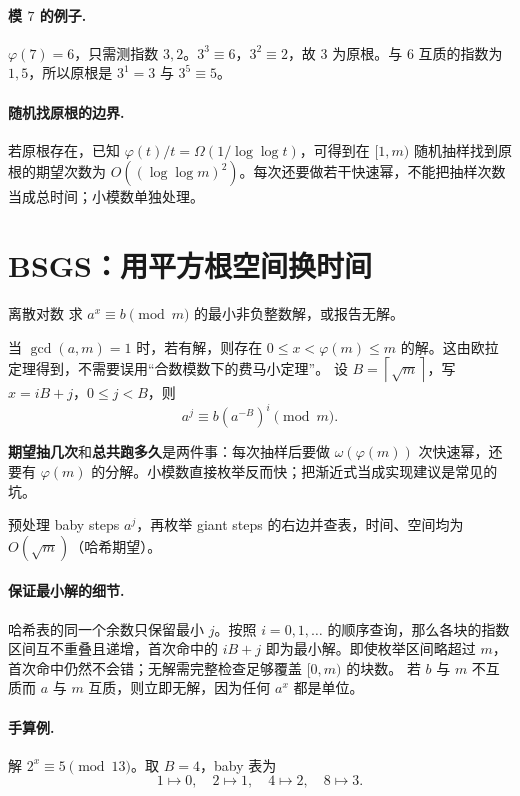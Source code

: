 \documentclass[UTF8,a4paper,11pt,twoside,openright,fontset=fandol]{ctexbook}
\theoremstyle{definition}
\newcommand{\ceil}[1]{\left\lceil #1\right\rceil}
\begin{document}
\paragraph{模 $7$ 的例子.} $\varphi(7)=6$，只需测指数 $3,2$。$3^3\equiv6$，$3^2\equiv2$，故 $3$ 为原根。与 $6$ 互质的指数为 $1,5$，所以原根是 $3^1=3$ 与 $3^5\equiv5$。
\paragraph{随机找原根的边界.} 若原根存在，已知 $\varphi(t)/t=\Omega(1/\log\log t)$，可得到在 $[1,m)$ 随机抽样找到原根的期望次数为 $O((\log\log m)^2)$。每次还要做若干快速幂，不能把抽样次数当成总时间；小模数单独处理。


\section{BSGS：用平方根空间换时间}
\begin{problem}{离散对数}
求 $a^x\equiv b\pmod m$ 的最小非负整数解，或报告无解。
\end{problem}
当 $\gcd(a,m)=1$ 时，若有解，则存在 $0\le x<\varphi(m)\le m$ 的解。这由欧拉定理得到，不需要误用“合数模数下的费马小定理”。
设 $B=\ceil{\sqrt m}$，写 $x=iB+j$，$0\le j<B$，则
\[
 a^j\equiv b(a^{-B})^i\pmod m.
\]

\begin{tip}
\textbf{期望抽几次}和\textbf{总共跑多久}是两件事：每次抽样后要做 $\omega(\varphi(m))$ 次快速幂，还要有 $\varphi(m)$ 的分解。小模数直接枚举反而快；把渐近式当成实现建议是常见的坑。
\end{tip}

预处理 baby steps $a^j$，再枚举 giant steps 的右边并查表，时间、空间均为 $O(\sqrt m)$（哈希期望）。


\paragraph{保证最小解的细节.}
哈希表的同一个余数只保留最小 $j$。按照 $i=0,1,\ldots$ 的顺序查询，那么各块的指数区间互不重叠且递增，首次命中的 $iB+j$ 即为最小解。即使枚举区间略超过 $m$，首次命中仍然不会错；无解需完整检查足够覆盖 $[0,m)$ 的块数。
若 $b$ 与 $m$ 不互质而 $a$ 与 $m$ 互质，则立即无解，因为任何 $a^x$ 都是单位。

\paragraph{手算例.} 解 $2^x\equiv5\pmod{13}$。取 $B=4$，baby 表为
\[
1\mapsto0,\quad2\mapsto1,\quad4\mapsto2,\quad8\mapsto3.
\]
\end{document}

